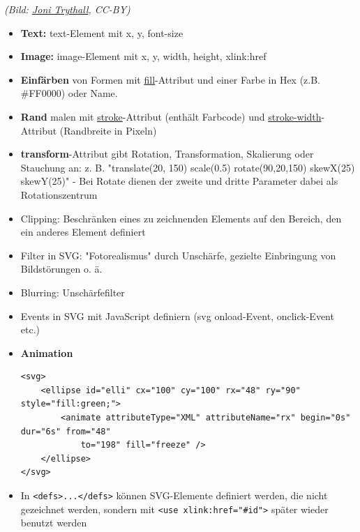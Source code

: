 \documentclass[12pt,landscape]{article}
\begin{document}
\begin{multicols}{3}
\begin{center}
\tiny{\textit{(Bild: \href{https://www.sitepoint.com/closer-look-svg-path-data/}{Joni Trythall}, CC-BY)}}
\end{center}
\begin{itemize}
\item \textbf{Text:} text-Element mit x, y, font-size
\item \textbf{Image:} image-Element mit x, y, width, height, xlink:href
\item \textbf{Einfärben} von Formen mit \underline{fill}-Attribut und einer Farbe in Hex (z.B. \#FF0000) oder Name.
\item \textbf{Rand} malen mit \underline{stroke}-Attribut (enthält Farbcode) und \underline{stroke-width}-Attribut (Randbreite in Pixeln)
\item \textbf{transform}-Attribut gibt Rotation, Transformation, Skalierung oder Stauchung an: z. B. "translate(20, 150) scale(0.5) rotate(90,20,150) skewX(25) skewY(25)" - Bei Rotate dienen der zweite und dritte Parameter dabei als Rotationszentrum
\item Clipping: Beschränken eines zu zeichnenden Elements auf den Bereich, den ein anderes Element definiert
\item Filter in SVG: "Fotorealismus" durch Unschärfe, gezielte Einbringung von Bildstörungen o. ä.
\item Blurring: Unschärfefilter
\item Events in SVG mit JavaScript definiern (svg onload-Event, onclick-Event etc.)
\item \textbf{Animation} \begin{lstlisting}
<svg>
    <ellipse id="elli" cx="100" cy="100" rx="48" ry="90" style="fill:green;">
        <animate attributeType="XML" attributeName="rx" begin="0s" dur="6s" from="48"
            to="198" fill="freeze" />
    </ellipse>
</svg> 
\end{lstlisting}
\item In \lstinline|<defs>...</defs>| können SVG-Elemente definiert werden, die nicht gezeichnet werden, sondern mit \lstinline|<use xlink:href="#id">| später wieder benutzt werden
\end{itemize}

\end{multicols}
\end{document}
